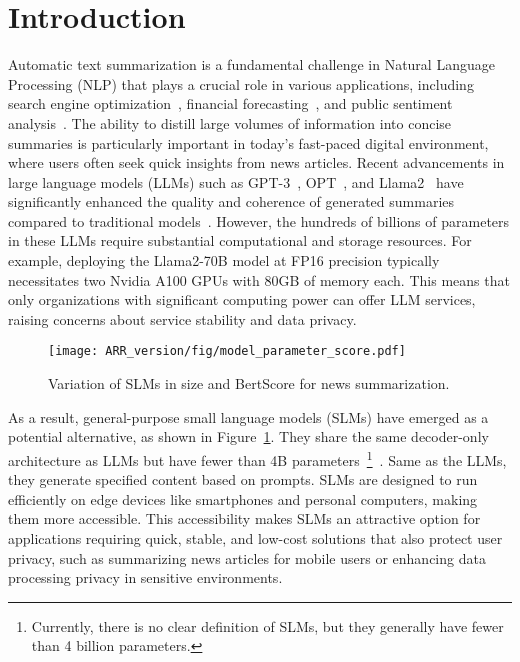 \section{Introduction}


Automatic text summarization is a fundamental challenge in Natural Language Processing (NLP) that plays a crucial role in various applications, including search engine optimization~\cite{2019soe}, financial forecasting~\cite{fintech}, and public sentiment analysis~\cite{twitter_news}. The ability to distill large volumes of information into concise summaries is particularly important in today's fast-paced digital environment, where users often seek quick insights from news articles. Recent advancements in large language models (LLMs) such as GPT-3~\cite{NEURIPS2020_gpt3}, OPT~\cite{opt}, and Llama2~\cite{touvron2023llama2openfoundation} have significantly enhanced the quality and coherence of generated summaries compared to traditional models~\cite{luhn1958automatic, dong-etal-2018-banditsum, zhang-etal-2018-neural, t5, genest-lapalme-2012-fully}. However, the hundreds of billions of parameters in these LLMs require substantial computational and storage resources. For example, deploying the Llama2-70B model at FP16 precision typically necessitates two Nvidia A100 GPUs with 80GB of memory each. This means that only organizations with significant computing power can offer LLM services, raising concerns about service stability and data privacy.


\begin{figure}
    \centering
    \texttt{[image: ARR\_version/fig/model\_parameter\_score.pdf]}
    \caption{Variation of SLMs in size and BertScore for news summarization. }
    \label{fig:intro}
\end{figure}




As a result, general-purpose small language models (SLMs) have emerged as a potential alternative, as shown in Figure~\ref{fig:intro}. They share the same decoder-only architecture as LLMs but have fewer than 4B parameters~\footnote{Currently, there is no clear definition of SLMs, but they generally have fewer than 4 billion parameters.}~\cite{azure2024phi,qwen,abdin2024phi3,llama3.2}. Same as the LLMs, they generate specified content based on prompts. SLMs are designed to run efficiently on edge devices like smartphones and personal computers, making them more accessible. This accessibility makes SLMs an attractive option for applications requiring quick, stable, and low-cost solutions that also protect user privacy, such as summarizing news articles for mobile users or enhancing data processing privacy in sensitive environments.

